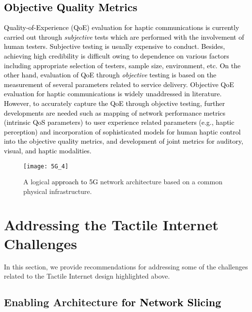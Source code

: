 \documentclass[journal]{IEEEtran}
\begin{document}
\subsection{\textcolor{black}{Objective Quality Metrics}}
\textcolor{black}{Quality-of-Experience (QoE) evaluation for haptic communications is currently carried out through \emph{subjective} tests  which are performed with the involvement of human testers. Subjective testing is usually expensive to conduct. Besides, achieving high credibility is difficult owing to dependence on various factors including appropriate selection of testers, sample size, environment, etc. On the other hand, evaluation of QoE through \emph{objective} testing is based on the measurement of several parameters related to service delivery. Objective QoE evaluation for haptic communications is widely unaddressed in literature. However, to accurately capture the QoE through objective testing, further developments are needed such as mapping of network performance metrics (intrinsic QoS parameters) to user experience related parameters (e.g., haptic perception) and incorporation of sophisticated models for human haptic control into the objective quality metrics, and development of joint metrics for auditory, visual, and haptic modalities.}

\begin{figure}
\centering
\texttt{[image: 5G\_4]}
\caption{ A logical \textcolor{black}{approach to 5G }network architecture based on a common physical infrastructure.}
\label{5G_arch}
\end{figure}








\section{Addressing the Tactile Internet Challenges}
In this section, we provide recommendations for addressing some of the challenges related to the Tactile Internet design highlighted above.



\subsection{Enabling Architecture \textcolor{black}{for Network Slicing}}
\end{document}
